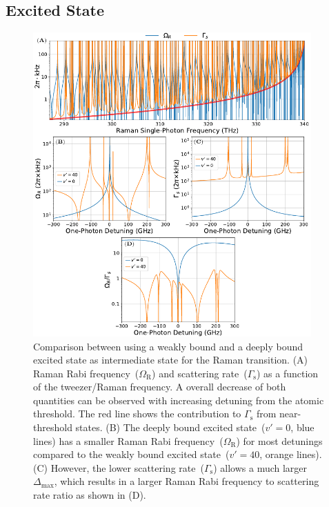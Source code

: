 \subsection{Excited State}
\label{ch:raman-transfer:state-selction:ext}

\begin{figure}
  \centering
  \includegraphics[width=0.95\textwidth]{figures/raman_transfer_theory_ratio_v0_vs_vhi.pdf}
  \caption[Comparison between using a weakly bound and a deeply bound excited state
  as intermediate state for the Raman transition]{
    Comparison between using a weakly bound and a deeply bound excited state
    as intermediate state for the Raman transition.
    (A) Raman Rabi frequency~($\Omega_{\mathrm{R}}$) and
    scattering rate~($\Gamma_{\mathrm{s}}$) as a function of the tweezer/Raman frequency.
    A overall decrease of both quantities can be observed
    with increasing detuning from the atomic threshold.
    The red line shows the contribution to $\Gamma_{\mathrm{s}}$ from near-threshold states.
    (B) The deeply bound excited state~($v'=0$, blue lines) has a smaller
    Raman Rabi frequency~($\Omega_{\mathrm{R}}$) for most detunings compared to the
    weakly bound excited state~($v'=40$, orange lines).
    (C) However, the lower scattering rate~($\Gamma_{\mathrm{s}}$) allows a much larger
    $\Delta_{\max}$, which results in a larger Raman Rabi frequency to scattering rate ratio
    as shown in (D).
    \label{fig:raman-transfer:v0-vs-vhi}}
\end{figure}

